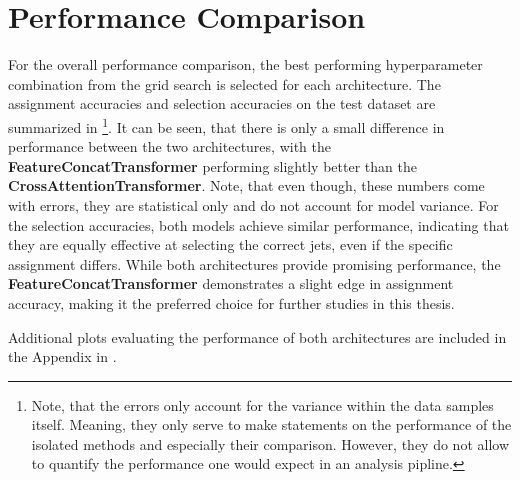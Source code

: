 \section{Performance Comparison}
\begin{table}[H]
    \centering
    
    \caption{Jet assignment accuracies and selection accuracies for each of the machine learning architectures. Each best performing hyperparameter combination from the grid search is used for the architectures. The \textbf{FeatureConcatTransformer + HLF} model includes additional high-level features as input. The uncertainties are statistical only and stem from bootstrap resampling. The validation sample size is about $2$ million events, while the test sample size is about $4$ million events.}
    \label{tab:ml_jet_assignment_performance}
\end{table}
For the overall performance comparison, the best performing hyperparameter combination from the grid search is selected for each architecture. The assignment accuracies and selection accuracies on the test dataset are summarized in \footnote{Note, that the errors only account for the variance within the data samples itself. Meaning, they only serve to make statements on the performance of the isolated methods and especially their comparison. However, they do not allow to quantify the performance one would expect in an analysis pipline.}. It can be seen, that there is only a small difference in performance between the two architectures, with the \textbf{FeatureConcatTransformer} performing slightly better than the \textbf{CrossAttentionTransformer}. Note, that even though, these numbers come with errors, they are statistical only and do not account for model variance. For the selection accuracies, both models achieve similar performance, indicating that they are equally effective at selecting the correct jets, even if the specific assignment differs.
While both architectures provide promising performance, the \textbf{FeatureConcatTransformer} demonstrates a slight edge in assignment accuracy, making it the preferred choice for further studies in this thesis.

Additional plots evaluating the performance of both architectures are included in the Appendix in .
